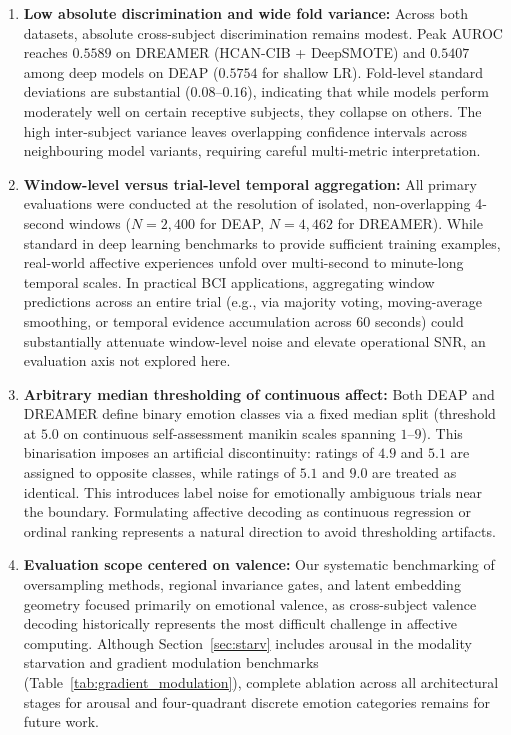 \documentclass[a4paper,fleqn]{cas-sc}
\begin{document}
\begin{enumerate}
    \item \textbf{Low absolute discrimination and wide fold variance:} Across both datasets, absolute cross-subject discrimination remains modest. Peak AUROC reaches $0.5589$ on DREAMER (HCAN-CIB + DeepSMOTE) and $0.5407$ among deep models on DEAP ($0.5754$ for shallow LR). Fold-level standard deviations are substantial ($0.08$--$0.16$), indicating that while models perform moderately well on certain receptive subjects, they collapse on others. The high inter-subject variance leaves overlapping confidence intervals across neighbouring model variants, requiring careful multi-metric interpretation.
    
    \item \textbf{Window-level versus trial-level temporal aggregation:} All primary evaluations were conducted at the resolution of isolated, non-overlapping 4-second windows ($N=2{,}400$ for DEAP, $N=4{,}462$ for DREAMER). While standard in deep learning benchmarks to provide sufficient training examples, real-world affective experiences unfold over multi-second to minute-long temporal scales. In practical BCI applications, aggregating window predictions across an entire trial (e.g., via majority voting, moving-average smoothing, or temporal evidence accumulation across 60 seconds) could substantially attenuate window-level noise and elevate operational SNR, an evaluation axis not explored here.

    \item \textbf{Arbitrary median thresholding of continuous affect:} Both DEAP and DREAMER define binary emotion classes via a fixed median split (threshold at $5.0$ on continuous self-assessment manikin scales spanning $1$--$9$). This binarisation imposes an artificial discontinuity: ratings of $4.9$ and $5.1$ are assigned to opposite classes, while ratings of $5.1$ and $9.0$ are treated as identical. This introduces label noise for emotionally ambiguous trials near the boundary. Formulating affective decoding as continuous regression or ordinal ranking represents a natural direction to avoid thresholding artifacts.

    \item \textbf{Evaluation scope centered on valence:} Our systematic benchmarking of oversampling methods, regional invariance gates, and latent embedding geometry focused primarily on emotional valence, as cross-subject valence decoding historically represents the most difficult challenge in affective computing. Although Section~\ref{sec:starv} includes arousal in the modality starvation and gradient modulation benchmarks (Table~\ref{tab:gradient_modulation}), complete ablation across all architectural stages for arousal and four-quadrant discrete emotion categories remains for future work.


\end{enumerate}
\end{document}
